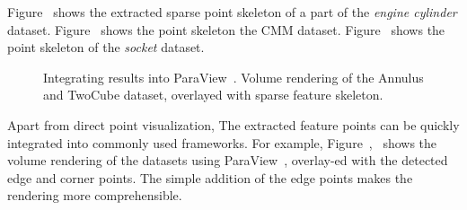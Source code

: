 Figure~ shows the extracted sparse point skeleton of a part of the \emph{engine cylinder} dataset. Figure~ shows the point skeleton the CMM dataset. Figure~ shows the point skeleton of the \emph{socket} dataset.

 \begin{figure}
    \centering
    \vspace {-3mm}
    \caption{Integrating results into ParaView~\cite{Ayachit2015}. Volume rendering of the Annulus and TwoCube dataset, overlayed with sparse feature skeleton.}
    \label{fig:paraview}
\end{figure}

%
Apart from direct point visualization,  The extracted feature points can be quickly integrated into commonly used frameworks. For example, Figure~,~ shows the volume rendering of the datasets using ParaView~\cite{Ayachit2015}, overlay-ed  with the detected edge and corner points. The simple addition of the edge points makes the rendering more comprehensible.

